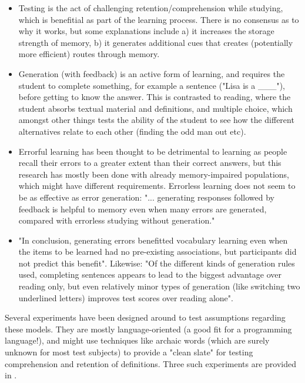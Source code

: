 \begin{itemize}

\item Testing is the act of challenging retention/comprehension while studying,
  which is benefitial as part of the learning process. There is no consensus as
  to why it works, but some explanations include a) it increases the storage
  strength of memory, b) it generates additional cues that creates (potentially
  more efficient) routes through memory.\cite[p.6]{potts2014benefit}

\item Generation (with feedback) is an active form of learning, and requires the
  student to complete something, for example a sentence ("Lisa is a \_\_\_"),
  before getting to know the answer. This is contrasted to reading, where the
  student absorbs textual material and definitions, and multiple choice, which
  amongst other things tests the ability of the student to see how the different
  alternatives relate to each other (finding the odd man out etc).

\item Errorful learning has been thought to be detrimental to learning as people
  recall their errors to a greater extent than their correct
  answers\cite{potts2014benefit}, but this research has mostly been done with
  already memory-impaired populations, which might have different requirements.
  Errorless learning does not seem to be as effective as error generation: "...
  generating responses followed by feedback is helpful to memory even when many
  errors are generated, compared with errorless studying without
  generation."\cite[p.54]{potts2014benefit}

\item "In conclusion, generating errors benefitted vocabulary learning even when
  the items to be learned had no pre-existing associations, but participants did
  not predict this benefit"\cite[p.54]{potts2014benefit}. Likewise: "Of the
  different kinds of generation rules used, completing sentences appears to lead
  to the biggest advantage over reading only, but even relatively minor types of
  generation (like switching two underlined letters) improves test scores over
  reading alone"\cite[p.73]{benassi2014applying}.

\end{itemize}

Several experiments have been designed around to test assumptions regarding
these models. They are mostly language-oriented (a good fit for a programming
language!), and might use techniques like archaic words (which are surely
unknown for most test subjects) to provide a "clean slate" for testing
comprehension and retention of definitions. Three such experiments are provided
in \cite{potts2014benefit}.

